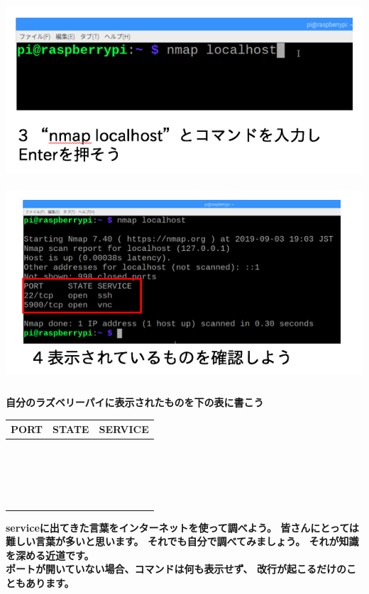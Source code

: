 \documentclass[a4paper,12pt,dvipdfmx]{jarticle}
\begin{document}
\includegraphics[width=14.404cm,height=6.722cm]{ome7-img032.png}
\bigskip
\includegraphics[width=14.542cm,height=7.458cm]{ome7-img031.png}
\flushleft

\bigskip
{\bfseries
	自分のラズベリーパイに表示されたものを下の表に書こう}

\begin{flushleft}
	\tablefirsthead{}
	\tablehead{}
	\tabletail{}
	\tablelasttail{}
	\begin{supertabular}{|m{5.467cm}|m{5.4690003cm}|m{5.155cm}|}
		\hline
		PORT &
		STATE &
		SERVICE\\\hline
		~
		&
		~
		&
		~
		\\\hline
		~
		&
		~
		&
		~
		\\\hline
		~
		&
		~
		&
		~
		\\\hline
		~
		&
		~
		&
		~
		\\\hline
	\end{supertabular}
\end{flushleft}
{\bfseries
serviceに出てきた言葉をインターネットを使って調べよう。
皆さんにとっては難しい言葉が多いと思います。
それでも自分で調べてみましょう。
それが知識を深める近道です。\\
ポートが開いていない場合、コマンドは何も表示せず、
改行が起こるだけのこともあります。
}
\end{document}
